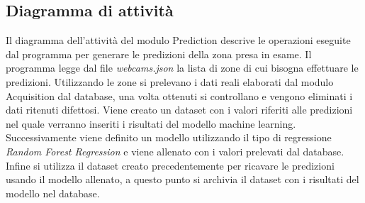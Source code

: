 \subsection{Diagramma di attività}\label{ArchitetturaDelProdottoArchitetturaModuloPredictionDiagrammaDiAttività}
Il diagramma dell'attività del modulo Prediction descrive le operazioni eseguite dal programma per generare le predizioni della zona presa in esame. Il programma legge dal file \textit{webcams.json} la lista di zone di cui bisogna effettuare le predizioni. Utilizzando le zone si prelevano i dati reali elaborati dal modulo Acquisition dal database, una volta ottenuti si controllano e vengono eliminati i dati ritenuti difettosi. Viene creato un dataset con i valori riferiti alle predizioni nel quale verranno inseriti i risultati del modello machine learning. Successivamente viene definito un modello utilizzando il tipo di regressione \textit{Random Forest Regression} e viene allenato con i valori prelevati dal database. Infine si utilizza il dataset creato precedentemente per ricavare le predizioni usando il modello allenato, a questo punto si archivia il dataset con i risultati del modello nel database.
